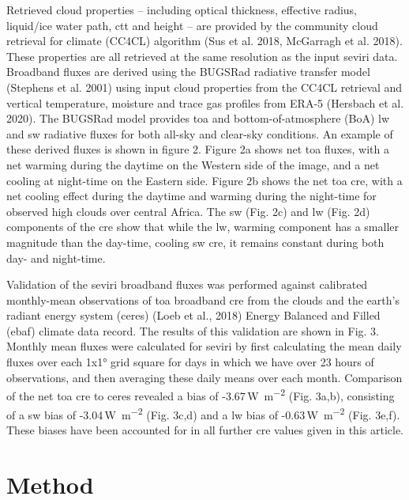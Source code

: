 Retrieved cloud properties -- including optical thickness, effective
radius, liquid/ice water path, \acrshort{ctt} and height -- are
provided by the community cloud retrieval for climate (CC4CL) algorithm
(Sus et al. 2018, McGarragh et al. 2018). These properties are all
retrieved at the same resolution as the input \acrshort{seviri} data. Broadband
fluxes are derived using the BUGSRad radiative transfer model (Stephens
et al. 2001) using input cloud properties from the CC4CL retrieval and
vertical temperature, moisture and trace gas profiles from ERA-5
(Hersbach et al. 2020). The BUGSRad model provides \acrshort{toa} and bottom-of-atmosphere (BoA) \acrshort{lw} and \acrshort{sw} radiative fluxes for both
all-sky and clear-sky conditions. An example of these derived fluxes is
shown in figure 2. Figure 2a shows net \acrshort{toa} fluxes, with a net warming
during the daytime on the Western side of the image, and a net cooling
at night-time on the Eastern side. Figure 2b shows the net \acrshort{toa} \acrshort{cre}, with
a net cooling effect during the daytime and warming during the
night-time for observed high clouds over central Africa. The \acrshort{sw} (Fig.
2c) and \acrshort{lw} (Fig. 2d) components of the \acrshort{cre} show that while the \acrshort{lw},
warming component has a smaller magnitude than the day-time, cooling \acrshort{sw}
\acrshort{cre}, it remains constant during both day- and night-time.

Validation of the \acrshort{seviri} broadband fluxes was performed against
calibrated monthly-mean observations of \acrshort{toa} broadband \acrshort{cre} from the
clouds and the earth's radiant energy system (\acrshort{ceres}) (Loeb et al., 2018)
Energy Balanced and Filled (\acrshort{ebaf}) climate data record. The results of
this validation are shown in Fig. 3. Monthly mean fluxes were calculated
for \acrshort{seviri} by first calculating the mean daily fluxes over each 1x1°
grid square for days in which we have over 23 hours of observations, and
then averaging these daily means over each month. Comparison of the net
\acrshort{toa} \acrshort{cre} to \acrshort{ceres} revealed a bias of -3.67\,\unit{W m^{-2}} (Fig.
3a,b), consisting of a \acrshort{sw} bias of -3.04\,\unit{W m^{-2}} (Fig.
3c,d) and a \acrshort{lw} bias of -0.63\,\unit{W m^{-2}} (Fig. 3e,f). These
biases have been accounted for in all further \acrshort{cre} values given in this
article.

\section{Method}

